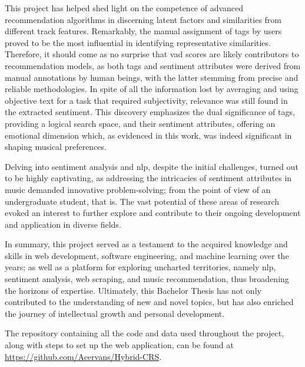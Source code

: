 This project has helped shed light on the competence of advanced recommendation algorithms in discerning latent factors and similarities from different track features. Remarkably, the manual assignment of tags by users proved to be the most influential in identifying representative similarities. Therefore, it should come as no surprise that \acs{vad} scores are likely contributors to recommendation models, as both tags and sentiment attributes were derived from manual annotations by human beings, with the latter stemming from precise and reliable methodologies. In spite of all the information lost by averaging and using objective text for a task that required subjectivity, relevance was still found in the extracted sentiment. This discovery emphasizes the dual significance of tags, providing a logical search space, and their sentiment attributes, offering an emotional dimension which, as evidenced in this work, was indeed significant in shaping musical preferences.

Delving into sentiment analysis and \acs{nlp}, despite the initial challenges, turned out to be highly captivating, as addressing the intricacies of sentiment attributes in music demanded innovative problem-solving; from the point of view of an undergraduate student, that is. The vast potential of these areas of research evoked an interest to further explore and contribute to their ongoing development and application in diverse fields.

In summary, this project served as a testament to the acquired knowledge and skills in web development, software engineering, and machine learning over the years; as well as a platform for exploring uncharted territories, namely \acs{nlp}, sentiment analysis, web scraping, and music recommendation, thus broadening the horizons of expertise. Ultimately, this Bachelor Thesis has not only contributed to the understanding of new and novel topics, but has also enriched the journey of intellectual growth and personal development.

The repository containing all the code and data used throughout the project, along with steps to set up the web application, can be found at \url{https://github.com/Acervans/Hybrid-CRS}.